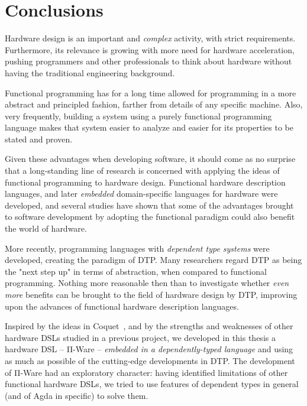 \chapter{Conclusions}
\label{chap:conclusions}

    Hardware design is an important and \emph{complex} activity, with strict requirements.
    Furthermore, its relevance is growing with more need for hardware acceleration,
    pushing programmers and other professionals to think about hardware without having
    the traditional engineering background.

    Functional programming has for a long time allowed for programming in a more
    abstract and principled fashion, farther from details of any specific machine.
    Also, very frequently, building a system using a purely functional programming language
    makes that system easier to analyze and easier for its properties to be stated and proven.

    Given these advantages when developing software, it should come as no surprise that
    a long-standing line of research is concerned with applying the ideas of functional
    programming to hardware design.
    Functional hardware description languages, and later
    \emph{embedded} domain-specific languages for hardware were developed,
    and several studies have shown that some of the advantages brought to software development
    by adopting the functional paradigm could also benefit the world of hardware.

    More recently, programming languages with \emph{dependent type systems} were developed,
    creating the paradigm of \acf{DTP}.
    Many researchers regard \ac{DTP} as being the "next step up" in terms of abstraction,
    when compared to functional programming.
    Nothing more reasonable then than to investigate whether \emph{even more} benefits
    can be brought to the field of hardware design by \ac{DTP},
    improving upon the advances of functional hardware description languages.

    Inspired by the ideas in Coquet~\cite{coquet2011}, and by the strengths and weaknesses of other
    hardware \acp{DSL} studied in a previous project, we developed in this thesis
    a hardware \ac{DSL} – Π-Ware – \emph{embedded in a dependently-typed language} and using
    as much as possible of the cutting-edge developments in \ac{DTP}.
    The development of Π-Ware had an exploratory character: having identified limitations of
    other functional hardware \acp{DSL}, we tried to use features of dependent types in general
    (and of Agda in specific) to solve them.

